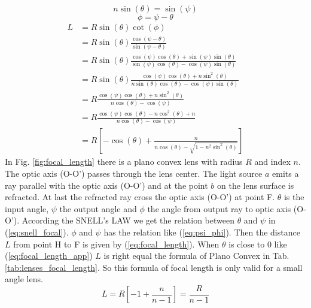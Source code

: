 \begin{equation}
 n\sin(\theta)=\sin(\psi)
\label{eq:snell_focal}
\end{equation}
\begin{equation}
\phi=\psi-\theta
\label{eq:psi_phi}
\end{equation}
\begin{align}
L&=R\sin(\theta)\cot(\phi) \nonumber\\
&=R\sin(\theta)\frac{\cos(\psi-\theta)}{ \sin(\psi-\theta)} \nonumber\\
&= R\sin(\theta)\frac{\cos(\psi)\cos(\theta)+\sin(\psi)\sin(\theta)}{\sin(\psi)\cos(\theta)-\cos(\psi)\sin(\theta)} \nonumber\\
&= R\sin(\theta)\frac{\cos(\psi)\cos(\theta)+n\sin^{2}(\theta)}{n\sin(\theta)\cos(\theta)-\cos(\psi)\sin(\theta)} \nonumber\\
&=R\frac{\cos(\psi)\cos(\theta)+n\sin^{2}(\theta)}{n\cos(\theta)-\cos(\psi)} \nonumber\\
&=R\frac{\cos(\psi)\cos(\theta)-n\cos^{2}(\theta)+n}{n\cos(\theta)-\cos(\psi)} \nonumber\\
&=R \left[-\cos(\theta)+\frac{n}{n\cos(\theta)-\sqrt{1-n^{2}\sin^{2}(\theta)}} \right]
\label{eq:focal_length}
\end{align}
In Fig. \ref{fig:focal_length} there is a plano convex lens with radius $R$ and index $n$. The optic axis (O-O') passes through the lens center.  The light source $a$ emits a ray parallel with the optic axis (O-O') and at the point $b$ on the lens surface is refracted. At last the refracted ray cross the optic axis (O-O') at point F. $\theta$ is the input angle, $\psi$ the output angle and $\phi$ the angle from output ray to optic axis (O-O'). According the SNELL's LAW we get the relation between $\theta$ and $\psi$ in (\ref{eq:snell_focal}). $\phi$ and $\psi$ has the relation like (\ref{eq:psi_phi}). Then the distance $L$ from point H to F is given by (\ref{eq:focal_length}). When $\theta$ is close to 0 like (\ref{eq:focal_length_app}) $L$ is right equal the formula of Plano Convex in Tab. \ref{tab:lenses_focal_length}. So this formula of focal length is only valid for a small angle lens. 
\begin{equation}
L=R\left[ -1+\frac{n}{n-1}\right]=\frac{R}{n-1}
\label{eq:focal_length_app}
\end{equation}
